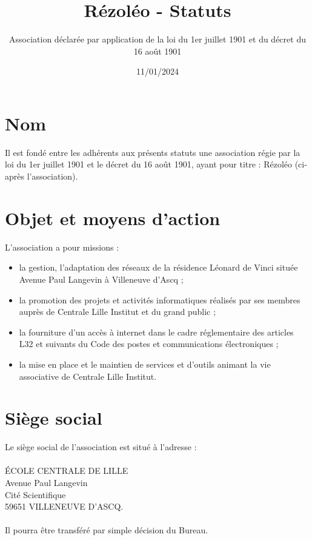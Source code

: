 \documentclass[12pt]{constitution}
\begin{document}
	\title{Rézoléo - Statuts}
	\author{Association déclarée par application de la loi du 1er juillet 1901 et du décret du 16 août 1901}
	\date{11/01/2024}
	\maketitle
	\newpage


	\section{Nom}
Il est fondé entre les adhérents aux présents statuts une association régie par la loi du 1er juillet 1901 et le décret du 16 août 1901, ayant pour titre : Rézoléo (ci-après \og l'association\fg).

	\section{Objet et moyens d'action}
	L'association a pour missions :
	\begin{itemize}
		\item[\textbullet] la gestion, l'adaptation des réseaux de la résidence Léonard de Vinci située Avenue Paul Langevin à Villeneuve d'Ascq ;
		\item[\textbullet]la promotion des projets et activités informatiques réalisés par ses membres auprès de Centrale Lille Institut et du grand public ;
		\item[\textbullet] la fourniture d'un accès à internet dans le cadre réglementaire des articles L32 et suivants du Code des postes et communications électroniques ;
		\item[\textbullet] la mise en place et le maintien de services et d'outils animant la vie associative de Centrale Lille Institut.
	\end{itemize}

	\section{Siège social}
	Le siège social de l'association est situé à l'adresse :\\
	\\
	\noindent ÉCOLE CENTRALE DE LILLE\\
	Avenue Paul Langevin\\
	Cité Scientifique\\
	59651 VILLENEUVE D'ASCQ.\\
	\\
	Il pourra être transféré par simple décision du Bureau.
\end{document}
